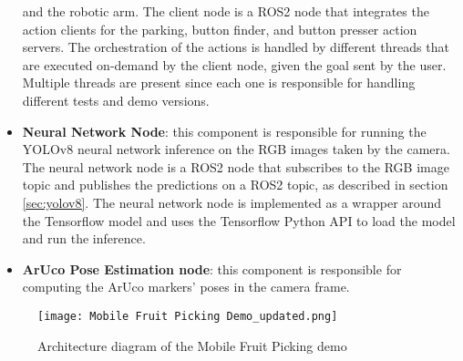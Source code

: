 \begin{itemize}
    and the robotic arm. The client node is a ROS2 node that integrates the action clients for the parking, button finder,
    and button presser action servers. The orchestration of the actions is handled by different threads that
    are executed on-demand by the client node, given the goal sent by the user. Multiple threads are present
    since each one is responsible for handling different tests and demo versions.
    \item \textbf{Neural Network Node}: this component is responsible for running the YOLOv8 neural network
    inference on the RGB images taken by the camera. The neural network node is a ROS2 node that subscribes
    to the RGB image topic and publishes the predictions on a ROS2 topic, as described in section \ref{sec:yolov8}.
    The neural network node is implemented as a wrapper around the Tensorflow model and uses the 
    Tensorflow Python API to load the model and run the inference.
    \item \textbf{ArUco Pose Estimation node}: this component is responsible for computing the ArUco markers' poses
    in the camera frame.
\end{itemize}

\begin{figure}[t]
    \centering
    \texttt{[image: Mobile Fruit Picking Demo\_updated.png]}
    \caption{Architecture diagram of the Mobile Fruit Picking demo}
    \label{fig:arch2}
\end{figure}
